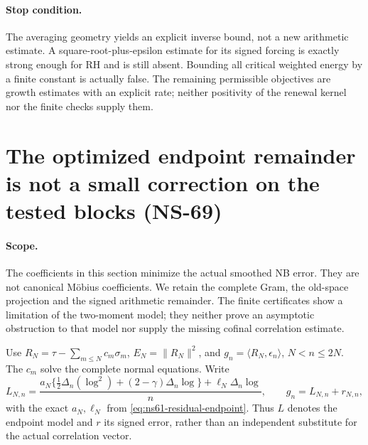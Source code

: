 \paragraph{Stop condition.}
The averaging geometry yields an explicit inverse bound, not a new
arithmetic estimate. A square-root-plus-epsilon estimate for its signed
forcing is exactly strong enough for RH and is still absent. Bounding
all critical weighted energy by a finite constant is actually false.
The remaining permissible objectives are growth estimates with an
explicit rate; neither positivity of the renewal kernel nor the finite
checks supply them.

\section{The optimized endpoint remainder is not a small correction on the tested blocks (NS-69)}
\label{sec:ns69-actual-remainder}

\paragraph{Scope.}
The coefficients in this section minimize the actual smoothed NB error.
They are not canonical M\"obius coefficients. We retain the complete
Gram, the old-space projection and the signed arithmetic remainder.
The finite certificates show a limitation of the two-moment model;
they neither prove an asymptotic obstruction to that model nor supply
the missing cofinal correlation estimate.

Use $R_N=\tau-\sum_{m\leq N}c_m\sigma_m$, $E_N=\|R_N\|^2$,
and $g_n=\langle R_N,\epsilon_n\rangle$, $N<n\leq2N$.
The $c_m$ solve the complete normal equations. Write
\[
 L_{N,n}=\frac{a_N\{\tfrac12\Delta_n(\log^2)
                  +(2-\gamma)\Delta_n\log\}
                   +\ell_N\Delta_n\log}{n},
 \qquad g_n=L_{N,n}+r_{N,n},
\]
with the exact $a_N,\ell_N$ from
\eqref{eq:ns61-residual-endpoint}. Thus $L$ denotes the endpoint
model and $r$ its signed error, rather than an independent substitute
for the actual correlation vector.

